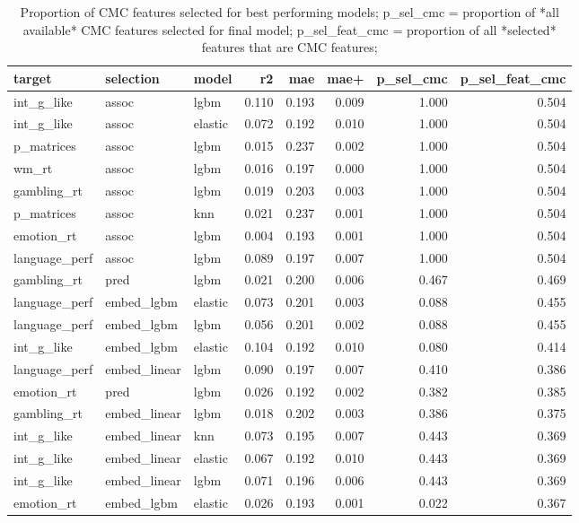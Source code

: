 \documentclass{article}
\begin{document}
\begin{table}
\caption{Proportion of CMC features selected for best performing models;
p\_sel\_cmc = proportion of *all available* CMC features selected for final model;
p\_sel\_feat\_cmc = proportion of all *selected* features that are CMC features;
}
\centering
\begin{tabular}{lllrrrrr}
	\toprule
	target & selection & model & r2 & mae & mae+ & p\_sel\_cmc & p\_sel\_feat\_cmc \\
	\midrule
	int\_g\_like & assoc & lgbm & 0.110 & 0.193 & 0.009 & 1.000 & 0.504 \\
	int\_g\_like & assoc & elastic & 0.072 & 0.192 & 0.010 & 1.000 & 0.504 \\
	p\_matrices & assoc & lgbm & 0.015 & 0.237 & 0.002 & 1.000 & 0.504 \\
	wm\_rt & assoc & lgbm & 0.016 & 0.197 & 0.000 & 1.000 & 0.504 \\
	gambling\_rt & assoc & lgbm & 0.019 & 0.203 & 0.003 & 1.000 & 0.504 \\
	p\_matrices & assoc & knn & 0.021 & 0.237 & 0.001 & 1.000 & 0.504 \\
	emotion\_rt & assoc & lgbm & 0.004 & 0.193 & 0.001 & 1.000 & 0.504 \\
	language\_perf & assoc & lgbm & 0.089 & 0.197 & 0.007 & 1.000 & 0.504 \\
	gambling\_rt & pred & lgbm & 0.021 & 0.200 & 0.006 & 0.467 & 0.469 \\
	language\_perf & embed\_lgbm & elastic & 0.073 & 0.201 & 0.003 & 0.088 & 0.455 \\
	language\_perf & embed\_lgbm & lgbm & 0.056 & 0.201 & 0.002 & 0.088 & 0.455 \\
	int\_g\_like & embed\_lgbm & elastic & 0.104 & 0.192 & 0.010 & 0.080 & 0.414 \\
	language\_perf & embed\_linear & lgbm & 0.090 & 0.197 & 0.007 & 0.410 & 0.386 \\
	emotion\_rt & pred & lgbm & 0.026 & 0.192 & 0.002 & 0.382 & 0.385 \\
	gambling\_rt & embed\_linear & lgbm & 0.018 & 0.202 & 0.003 & 0.386 & 0.375 \\
	int\_g\_like & embed\_linear & knn & 0.073 & 0.195 & 0.007 & 0.443 & 0.369 \\
	int\_g\_like & embed\_linear & elastic & 0.067 & 0.192 & 0.010 & 0.443 & 0.369 \\
	int\_g\_like & embed\_linear & lgbm & 0.071 & 0.196 & 0.006 & 0.443 & 0.369 \\
	emotion\_rt & embed\_lgbm & elastic & 0.026 & 0.193 & 0.001 & 0.022 & 0.367 \\

\end{tabular}
\end{table}
\end{document}
